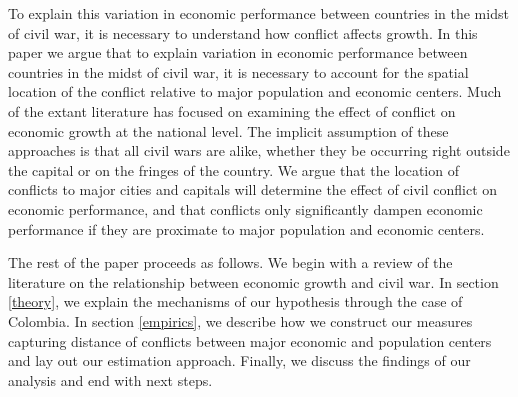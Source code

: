 To explain this variation in economic performance between countries in the midst of civil war, it is necessary to understand how conflict affects growth. In this paper we argue that to explain variation in economic performance between countries in the midst of civil war, it is necessary to account for the spatial location of the conflict relative to major population and economic centers. Much of the extant literature has focused on examining the effect of conflict on economic growth at the national level. The implicit assumption of these approaches is that all civil wars are alike, whether they be occurring right outside the capital or on the fringes of the country. We argue that the location of conflicts to major cities and capitals will determine the effect of civil conflict on economic performance, and that conflicts only significantly dampen economic performance if they are proximate to major population and economic centers. 

The rest of the paper proceeds as follows.  We begin with a review of the literature on the relationship between economic growth and civil war. In section \ref{theory}, we explain the mechanisms of our hypothesis through the case of Colombia. In section \ref{empirics}, we describe how we construct our measures capturing distance of conflicts between major economic and population centers and lay out our estimation approach. Finally, we discuss the findings of our analysis and end with next steps. 